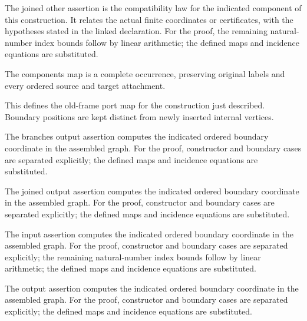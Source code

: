 The joined other assertion is the compatibility law for the indicated component of this construction. It relates the actual finite coordinates or certificates, with the hypotheses stated in the linked declaration.
For the proof, the remaining natural-number index bounds follow by linear arithmetic; the defined maps and incidence equations are substituted.
\par{}

The components map is a complete occurrence, preserving original labels and every ordered source and target attachment.
\par{}

This defines the old-frame port map for the construction just described. Boundary positions are kept distinct from newly inserted internal vertices.
\par{}

The branches output assertion computes the indicated ordered boundary coordinate in the assembled graph.
For the proof, constructor and boundary cases are separated explicitly; the defined maps and incidence equations are substituted.
\par{}

The joined output assertion computes the indicated ordered boundary coordinate in the assembled graph.
For the proof, constructor and boundary cases are separated explicitly; the defined maps and incidence equations are substituted.
\par{}

The input assertion computes the indicated ordered boundary coordinate in the assembled graph.
For the proof, constructor and boundary cases are separated explicitly; the remaining natural-number index bounds follow by linear arithmetic; the defined maps and incidence equations are substituted.
\par{}

The output assertion computes the indicated ordered boundary coordinate in the assembled graph.
For the proof, constructor and boundary cases are separated explicitly; the defined maps and incidence equations are substituted.
\par{}

